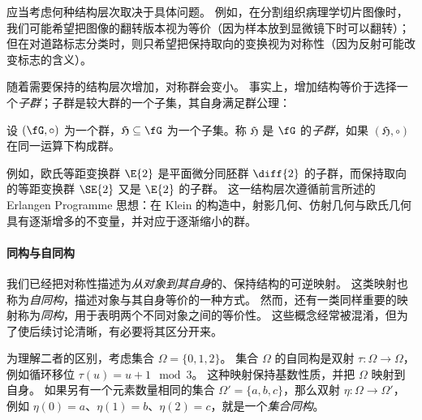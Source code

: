 应当考虑何种结构层次取决于具体问题。
例如，在分割组织病理学切片图像时，我们可能希望把图像的翻转版本视为等价（因为样本放到显微镜下时可以翻转）；但在对道路标志分类时，则只希望把保持取向的变换视为对称性（因为反射可能改变标志的含义）。

随着需要保持的结构层次增加，对称群会变小。
事实上，增加结构等价于选择一个\emph{子群}；子群是较大群的一个子集，其自身满足群公理：
 
 \begin{tcolorbox}[width=\linewidth,
                   boxsep=0pt,
                   left=7.5pt,
                   right=7.5pt,
                   top=7.5pt,
                   bottom=7.5pt,
                   arc=0pt,
                   boxrule=0pt,toprule=0pt,
                   colback=boxgray,
                   ]%
 设 $(\fG,\circ)$ 为一个群，$\mathfrak{H} \subseteq \fG$ 为一个子集。称 $\mathfrak{H}$ 是 $\fG$ 的{\em 子群}，如果 $(\mathfrak{H},\circ)$ 在同一运算下构成群。
 \end{tcolorbox}
 
例如，欧氏等距变换群 $\E{2}$ 是平面微分同胚群 $\diff{2}$ 的子群，而保持取向的等距变换群 $\SE{2}$ 又是 $\E{2}$ 的子群。
这一结构层次遵循前言所述的 Erlangen Programme 思想：在 Klein 的构造中，射影几何、仿射几何与欧氏几何具有逐渐增多的不变量，并对应于逐渐缩小的群。


\paragraph{同构与自同构}

我们已经把对称性描述为\emph{从对象到其自身}的、保持结构的可逆映射。
这类映射也称为\emph{自同构}，描述对象与其自身等价的一种方式。
然而，还有一类同样重要的映射称为\emph{同构}，用于表明两个不同对象之间的等价性。
这些概念经常被混淆，但为了使后续讨论清晰，有必要将其区分开来。

为理解二者的区别，考虑集合 $\Omega = \{0,1,2\}$。
集合 $\Omega$ 的自同构是双射 $\tau : \Omega \rightarrow \Omega$，例如循环移位 $\tau(u) = u + 1 \mod 3$。
这种映射保持基数性质，并把 $\Omega$ 映射到自身。
如果另有一个元素数量相同的集合 $\Omega' = \{a, b, c\}$，那么双射 $\eta : \Omega \rightarrow \Omega'$，例如 $\eta(0) = a$、$\eta(1) = b$、$\eta(2) = c$，就是一个{\em 集合同构}。


